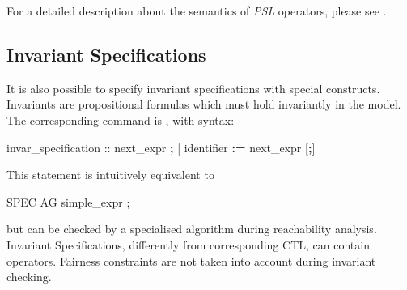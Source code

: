 For a detailed description about the semantics of \emph{PSL}
operators, please see \cite{PSLLRM}.

\subsection{Invariant Specifications}
\label{INVAR Specifications}

It is also possible to specify invariant specifications with special
constructs. Invariants are propositional formulas which must hold
invariantly in the model.
%
The corresponding command is , with syntax:
%
\begin{Grammar}
invar_specification ::  next_expr \textbf{;}
                     |   identifier \textbf{:=} next_expr [\textbf{;}]
\end{Grammar}
%
This statement is intuitively equivalent to
%
\begin{Grammar}
SPEC  AG simple_expr ;
\end{Grammar}
%
but can be checked by a specialised algorithm during reachability
analysis. Invariant Specifications, differently from corresponding
CTL, can contain  operators.  Fairness constraints are
not taken into account during invariant checking.

